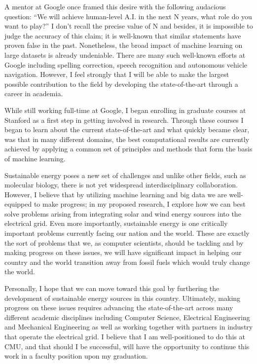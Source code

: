 \documentclass[12pt]{article}
\begin{document}
A mentor at Google once framed this desire with the following audacious question: ``We will achieve human-level A.I. in the next N years, what role do you want to play?'' I don't recall the precise value of N  and besides, it is impossible to judge the accuracy of this claim; it is well-known that similar statements have proven false in the past. Nonetheless, the broad impact of machine learning on large datasets is already undeniable. There are many such well-known efforts at Google including spelling correction, speech recognition and autonomous vehicle navigation. However, I feel strongly that I will be able to make the largest possible contribution to the field by developing the state-of-the-art through a career in academia.

While still working full-time at Google, I began enrolling in graduate courses at Stanford as a first step in getting involved in research. Through these courses I began to learn about the current state-of-the-art and what quickly became clear, was that in many different domains, the best computational results are currently achieved by applying a common set of principles and methods that form the basis of machine learning.

Sustainable energy poses a new set of challenges and unlike other fields, such as molecular biology, there is not yet widespread interdisciplinary collaboration. However, I believe that by utilizing machine learning and big data we are well-equipped to make progress; in my proposed research, I explore how we can best solve problems arising from integrating solar and wind energy sources into the electrical grid. Even more importantly, sustainable energy is one critically important problems currently facing our nation and the world. These are exactly the sort of problems that we, as computer scientists, should be tackling and by making progress on these issues, we will have significant impact in helping our country and the world transition away from fossil fuels which would truly change the world.

Personally, I hope that we can move toward this goal by furthering the development of sustainable energy sources in this country. Ultimately, making progress on these issues requires advancing the state-of-the-art across many different academic disciplines including Computer Science, Electrical Engineering and Mechanical Engineering as well as working together with partners in industry that operate the electrical grid. I believe that I am well-positioned to do this at CMU, and that should I be successful, will have the opportunity to continue this work in a faculty position upon my graduation.
\end{document}

